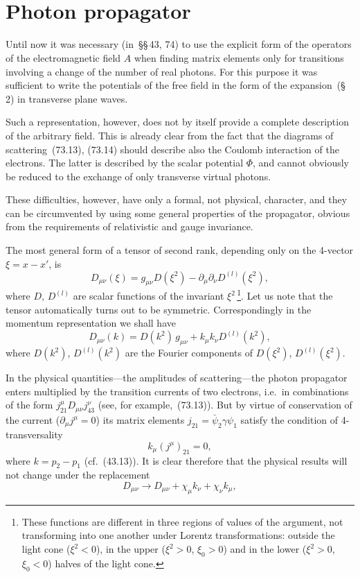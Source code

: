 \section{Photon propagator}

Until now it was necessary (in~\S\S\,43, 74) to use the explicit form of the operators of the electromagnetic field $\hat{A}$ when finding matrix elements only for transitions involving a change of the number of real photons. For this purpose it was sufficient to write the potentials of the free field in the form of the expansion~(\S\,2) in transverse plane waves.

Such a representation, however, does not by itself provide a complete description of the arbitrary field. This is already clear from the fact that the diagrams of scattering~(73.13), (73.14) should describe also the Coulomb interaction of the electrons. The latter is described by the scalar potential $\Phi$, and cannot obviously be reduced to the exchange of only transverse virtual photons.

These difficulties, however, have only a formal, not physical, character, and they can be circumvented by using some general properties of the propagator, obvious from the requirements of relativistic and gauge invariance.

The most general form of a tensor of second rank, depending only on the 4-vector $\xi = x - x'$, is
\begin{equation}
D_{\mu\nu}(\xi) = g_{\mu\nu}D(\xi^2) - \partial_\mu\partial_\nu D^{(l)}(\xi^2),
\tag{76.2}
\end{equation}
where $D$, $D^{(l)}$ are scalar functions of the invariant $\xi^2$\,\footnote{These functions are different in three regions of values of the argument, not transforming into one another under Lorentz transformations: outside the light cone ($\xi^2 < 0$), in the upper ($\xi^2 > 0$, $\xi_0 > 0$) and in the lower ($\xi^2 > 0$, $\xi_0 < 0$) halves of the light cone.}. Let us note that the tensor automatically turns out to be symmetric. Correspondingly in the momentum representation we shall have
\begin{equation}
D_{\mu\nu}(k) = D(k^2)\,g_{\mu\nu} + k_\mu k_\nu D^{(l)}(k^2),
\tag{76.3}
\label{eq:76.3}
\end{equation}
where $D(k^2)$, $D^{(l)}(k^2)$ are the Fourier components of $D(\xi^2)$, $D^{(l)}(\xi^2)$.

In the physical quantities---the amplitudes of scattering---the photon propagator enters multiplied by the transition currents of two electrons, i.e.\ in combinations of the form $j^\mu_{21}D_{\mu\nu}j^\nu_{43}$ (see, for example,~(73.13)). But by virtue of conservation of the current ($\partial_\mu j^\mu = 0$) its matrix elements $j_{21} = \bar{\psi}_2\gamma\psi_1$ satisfy the condition of 4-transversality
\begin{equation}
k_\mu(j^\mu)_{21} = 0,
\tag{76.4}
\end{equation}
where $k = p_2 - p_1$ (cf.~(43.13)). It is clear therefore that the physical results will not change under the replacement
\begin{equation}
D_{\mu\nu} \to D_{\mu\nu} + \chi_\mu k_\nu + \chi_\nu k_\mu,
\tag{76.5}
\end{equation}

